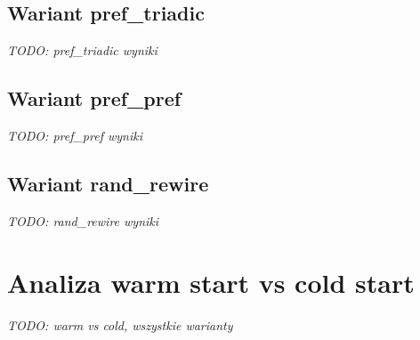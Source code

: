 \subsection{Wariant pref\_triadic}

\emph{TODO: pref\_triadic wyniki}

\subsection{Wariant pref\_pref}

\emph{TODO: pref\_pref wyniki}

\subsection{Wariant rand\_rewire}

\emph{TODO: rand\_rewire wyniki}

\section{Analiza warm start vs cold start}

\emph{TODO: warm vs cold, wszystkie warianty}



